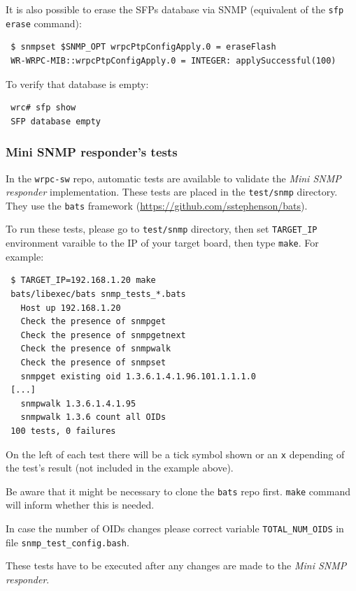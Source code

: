 \documentclass[a4paper, 12pt]{article}
\begin{document}
It is also possible to erase the SFPs database via SNMP (equivalent of
the \texttt{sfp erase} command):
\begin{lstlisting}
 $ snmpset $SNMP_OPT wrpcPtpConfigApply.0 = eraseFlash
 WR-WRPC-MIB::wrpcPtpConfigApply.0 = INTEGER: applySuccessful(100)
\end{lstlisting}

To verify that database is empty:
\begin{lstlisting}
 wrc# sfp show
 SFP database empty
\end{lstlisting}

\subsubsection{Mini SNMP responder's tests}
\label{Mini SNMP responder's tests}

In the \texttt{wrpc-sw} repo, automatic tests are available to validate the \textit{Mini
SNMP responder} implementation. These tests are placed in the \texttt{test/snmp}
directory.
They use the \texttt{bats} framework (\url{https://github.com/sstephenson/bats}).

To run these tests, please go to \texttt{test/snmp} directory, then set
\texttt{TARGET\_IP} environment varaible to the IP of your target board, then type
\texttt{make}. For example:
\begin{lstlisting}
 $ TARGET_IP=192.168.1.20 make
 bats/libexec/bats snmp_tests_*.bats
   Host up 192.168.1.20
   Check the presence of snmpget
   Check the presence of snmpgetnext
   Check the presence of snmpwalk
   Check the presence of snmpset
   snmpget existing oid 1.3.6.1.4.1.96.101.1.1.1.0
 [...]
   snmpwalk 1.3.6.1.4.1.95
   snmpwalk 1.3.6 count all OIDs
 100 tests, 0 failures
\end{lstlisting}
On the left of each test there will be a tick symbol shown or an \texttt{x}
depending of the test's result (not included in the example above).

Be aware that it might be necessary to clone the \texttt{bats} repo first.
\texttt{make} command will inform whether this is needed.

In case the number of OIDs changes please correct variable \texttt{TOTAL\_NUM\_OIDS}
in file \texttt{snmp\_test\_config.bash}.

These tests have to be executed after any changes are made to the \textit{Mini SNMP
responder}.
\end{document}
